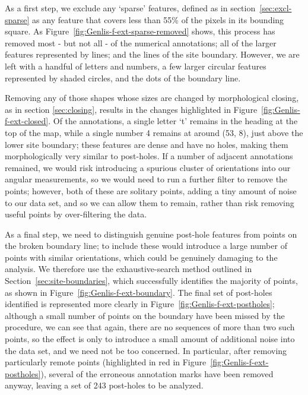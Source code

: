 \documentclass[../../ArchStats.tex]{subfiles}
\begin{document}
As a first step, we exclude any `sparse' features, defined as in section~\ref{sec:excl-sparse} as any feature that covers less than 55\% of the pixels in its bounding square. As Figure~\ref{fig:Genlis-f-ext-sparse-removed} shows, this process has removed most - but not all - of the numerical annotations; all of the larger features represented by lines; and the lines of the site boundary. However, we are left with a handful of letters and numbers, a few larger circular features represented by shaded circles, and the dots of the boundary line.

Removing any of those shapes whose sizes are changed by morphological closing, as in section \ref{sec:closing}, results in the changes highlighted in Figure~\ref{fig:Genlis-f-ext-closed}. Of the annotations, a single letter `t' remains in the heading at the top of the map, while a single number 4 remains at around (53, 8), just above the lower site boundary; these features are dense and have no holes, making them morphologically very similar to post-holes. If a number of adjacent annotations remained, we would risk introducing a spurious  cluster of orientations into our angular measurements, so we would need to run a further filter to remove the points; however, both of these are solitary points, adding a tiny amount of noise to our data set, and so we can allow them to remain, rather than risk removing useful points by over-filtering the data.

As a final step, we need to distinguish genuine post-hole features from points on the broken boundary line; to include these would introduce a large number of points with similar orientations, which could be genuinely damaging to the analysis. We therefore use the exhaustive-search method outlined in Section~\ref{sec:site-boundaries}, which successfully identifies the majority of points, as shown in Figure~\ref{fig:Genlis-f-ext-boundary}. The final set of post-holes identified is represented more clearly in Figure~\ref{fig:Genlis-f-ext-postholes}; although a small number of points on the boundary have been missed by the procedure, we can see that again, there are no sequences of more than two such points, so the effect is only to introduce a small amount of additional noise into the data set, and we need not be too concerned. In particular, after removing particularly remote points (highlighted in red in Figure~\ref{fig:Genlis-f-ext-postholes}), several of the erroneous annotation marks have been removed anyway, leaving a set of 243 post-holes to be analyzed.
\end{document}
